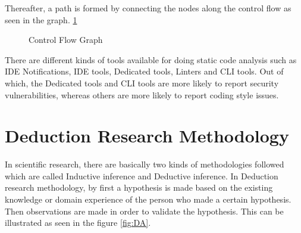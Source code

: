 Thereafter, a path is formed by connecting the nodes along the control flow as seen in the graph. \ref{fig:CFG} \\

\begin{figure}
\centering


\caption{Control Flow Graph}
\label{fig:CFG}
\end{figure} 


There are different kinds of tools available for doing static code analysis such as IDE Notifications, IDE tools, Dedicated tools, Linters and CLI tools. Out of which, the Dedicated tools and CLI tools are more likely to report security vulnerabilities, whereas others are more likely to report coding style issues. 

\section{Deduction Research Methodology}

In scientific research, there are basically two kinds of methodologies followed which are called Inductive inference and Deductive inference.  In Deduction research methodology,  by first a hypothesis is made based on the existing knowledge or domain experience of the person who made a certain hypothesis.  Then observations are made in order to validate the hypothesis. This can be illustrated as seen in the figure \ref{fig:DA}. \\ \\


